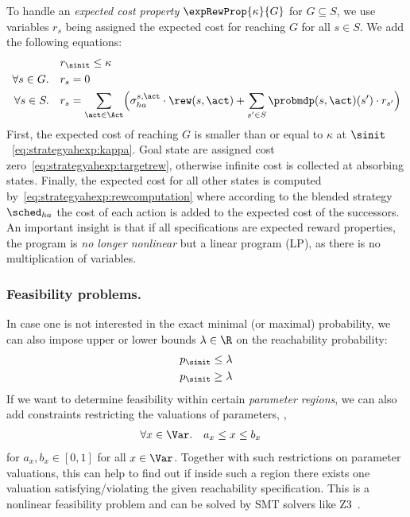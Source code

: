 	To handle an \emph{expected cost property} $\expRewProp{\kappa}{G}$ for $G\subseteq S$, we use variables $r_s$ being assigned the expected cost for reaching $G$ for all $s\in S$. We add the following equations:
%	
	\begin{align}
							 &\quad r_{\sinit}\leq \kappa\label{eq:strategyahexp:kappa}\\
			\forall s\in G.	 &\quad r_s=0\label{eq:strategyahexp:targetrew}\\
			\forall s\in S.	&\quad r_s= \sum_{\act\in\Act} \Bigl(\sigma_{ha}^{s,\act} \cdot \rew(s,\act) +    \sum_{s'\in S}	\probmdp (s,\act)(s') \cdot r_{s'}\Bigr)\label{eq:strategyahexp:rewcomputation}	
		\end{align}
		First, the expected cost of reaching $G$ is smaller than or equal to $\kappa$ at $\sinit$~\eqref{eq:strategyahexp:kappa}. Goal state are assigned cost zero~\eqref{eq:strategyahexp:targetrew}, otherwise infinite cost is collected at absorbing states. Finally, the expected cost for all other states is computed by~\eqref{eq:strategyahexp:rewcomputation} where according to the blended strategy $\sched_{ha}$ the cost of each action is added to the expected cost of the successors. 
	An important insight is that if all specifications are expected reward properties, the program is \emph{no longer nonlinear} but a linear program (LP), as there is no multiplication of variables.
%

\medskip

\subsubsection{Feasibility problems.} In case one is not interested in the exact minimal (or maximal) probability, we can also impose upper or lower bounds $\lambda\in\R$ on the reachability probability:
		\begin{align}
		p_{\sinit}\leq\lambda\\
		p_{\sinit}\geq\lambda
		\end{align}
		If we want to determine feasibility within certain \emph{parameter regions}, we can also add constraints restricting the valuations of parameters, \eg, 
	\begin{align}
		\forall x\in \Var.	 &\quad a_x\leq x\leq b_x\label{eq:region}
	\end{align}
	for $a_x,b_x\in[0,1]$ for all $x\in\Var$.
		Together with such restrictions on parameter valuations, this can help to find out if inside such a region there exists one valuation satisfying/violating the given reachability specification. This is a nonlinear feasibility problem and can be solved by SMT solvers like Z3~\cite{demoura_nlsat}.
		
